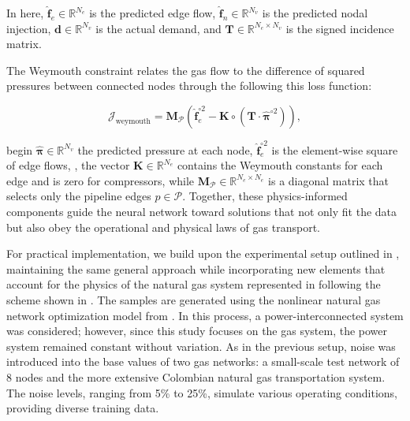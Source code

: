 \noindent In here, \( \hat{\mathbf{f}}_e \in \mathbb{R}^{N_e} \) is the predicted edge flow, \( \hat{\mathbf{f}}_n \in \mathbb{R}^{N_v} \) is the predicted nodal injection, \( \mathbf{d} \in \mathbb{R}^{N_v} \) is the actual demand, and \( \mathbf{T} \in \mathbb{R}^{N_e \times N_v} \) is the signed incidence matrix.


The Weymouth constraint relates the gas flow to the difference of squared pressures between connected nodes through the following this loss function:

\begin{equation} \label{eq:Weymouth_GNN}
\mathcal{J}_{\text{weymouth}} =  \mathbf{M}_{\mathcal{P}} \left( \hat{\mathbf{f}}_e^{\circ 2} - \mathbf{K} \circ \left( \mathbf{T} \cdot \hat{\boldsymbol{\pi}}^{\circ 2} \right) \right),
\end{equation}


\noindent begin \( \hat{\boldsymbol{\pi}} \in \mathbb{R}^{N_v} \) the predicted pressure at each node, \( \hat{\mathbf{f}}_e^{\circ 2} \) is the element-wise square of edge flows, , the vector \( \mathbf{K} \in \mathbb{R}^{N_e} \) contains the Weymouth constants for each edge and is zero for compressors, while \( \mathbf{M}_{\mathcal{P}} \in \mathbb{R}^{N_e \times N_e} \) is a diagonal matrix that selects only the pipeline edges \( p \in \mathcal{P} \). Together, these physics-informed components guide the neural network toward solutions that not only fit the data but also obey the operational and physical laws of gas transport.


For practical implementation, we build upon the experimental setup outlined in , maintaining the same general approach while incorporating new elements that account for the physics of the natural gas system represented in  following the scheme shown in . The samples are generated using the nonlinear natural gas network optimization model from . In this process, a power-interconnected system was considered; however, since this study focuses on the gas system, the power system remained constant without variation. As in the previous setup, noise was introduced into the base values of two gas networks: a small-scale test network of 8 nodes and the more extensive Colombian natural gas transportation system. The noise levels, ranging from 5\% to 25\%, simulate various operating conditions, providing diverse training data.


